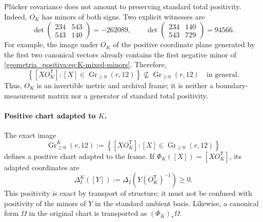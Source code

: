 Plücker covariance does not amount to preserving standard total positivity. Indeed, \(O_K\) has minors of both signs. Two explicit witnesses are
\begin{equation}
 \det\begin{pmatrix}234&543\\543&140\end{pmatrix}=-262089,
 \qquad
 \det\begin{pmatrix}234&140\\543&729\end{pmatrix}=94566.
 \label{geometria_positiva:eq:K-mixed-minors}
\end{equation}
For example, the image under \(O_K\) of the positive coordinate plane generated by the first two canonical vectors already contains the first negative minor of \eqref{geometria_positiva:eq:K-mixed-minors}. Therefore,
\begin{equation}
 \left\{[XO_K^{\mathsf T}]:
 [X]\in\operatorname{Gr}_{\ge0}(r,12)\right\}
 \not\subseteq\operatorname{Gr}_{\ge0}(r,12)
 \quad\text{in general}.
 \label{geometria_positiva:eq:K-not-standard-totally-positive}
\end{equation}
Thus, \(O_K\) is an invertible metric and archival frame; it is neither a boundary-measurement matrix nor a generator of standard total positivity.

\paragraph{Positive chart adapted to \(K\).}
The exact image
\begin{equation}
 \operatorname{Gr}_{\ge0}^{K}(r,12)
 :=\left\{[XO_K^{\mathsf T}]:
 [X]\in\operatorname{Gr}_{\ge0}(r,12)\right\}
 \label{geometria_positiva:eq:K-adapted-positive-chart}
\end{equation}
defines a positive chart adapted to the frame. If \(\Phi_K([X])=[XO_K^{\mathsf T}]\), its adapted coordinates are
\begin{equation}
 \Delta_I^K([Y])
 :=\Delta_I\!\left(Y(O_K^{\mathsf T})^{-1}\right)\ge0.
 \label{geometria_positiva:eq:K-adapted-plucker}
\end{equation}
This positivity is exact by transport of structure; it must not be confused with positivity of the minors of \(Y\) in the standard ambient basis. Likewise, a canonical form \(\Omega\) in the original chart is transported as \((\Phi_K)_*\Omega\).

